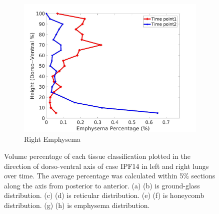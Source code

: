 \begin{figure}[H]
\begin{subfigure}{.42\linewidth}
  \includegraphics[width=\linewidth,trim={{.0\wd0} {.0\wd0} {.0\wd0} {.0\wd0}},clip]{Appendix/Image_AppexA/DorsoToVentral/IPF14RightLungEmphysemaDiseaseDorsoToVentral.jpg}
  \caption{Right Emphysema}
  \label{fig:IPF14DiseaseDorsoToVentral-h}
\end{subfigure}
\caption{Volume percentage of each tissue classification plotted in the direction of dorso-ventral axis of case IPF14 in left and right lungs over time. The average percentage was calculated within 5\% sections along the axis from posterior to anterior. (a) (b) is ground-glass distribution. (c) (d) is reticular distribution. (e) (f) is honeycomb distribution. (g) (h) is emphysema distribution.}
\label{fig:IPF14DiseaseDorsoToVentral}
\end{figure}

